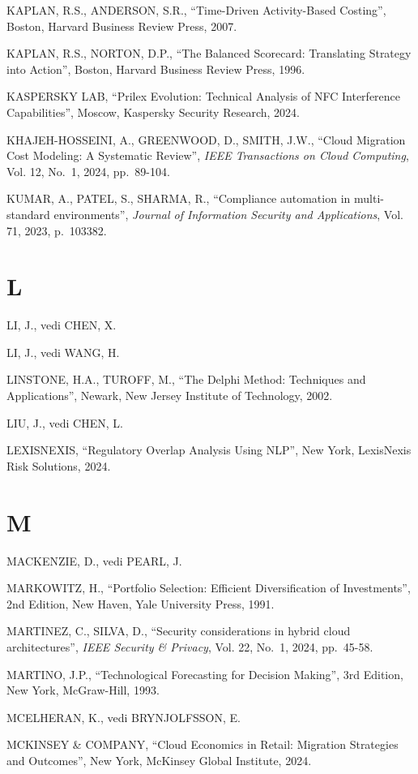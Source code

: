 \documentclass[12pt,a4paper,oneside]{book}
\numberwithin{figure}{chapter} %
\numberwithin{table}{chapter}  %
\begin{document}
KAPLAN, R.S., ANDERSON, S.R., ``Time-Driven Activity-Based Costing'',
Boston, Harvard Business Review Press, 2007.

KAPLAN, R.S., NORTON, D.P., ``The Balanced Scorecard: Translating
Strategy into Action'', Boston, Harvard Business Review Press, 1996.

KASPERSKY LAB, ``Prilex Evolution: Technical Analysis of NFC
Interference Capabilities'', Moscow, Kaspersky Security Research, 2024.

KHAJEH-HOSSEINI, A., GREENWOOD, D., SMITH, J.W., ``Cloud Migration Cost
Modeling: A Systematic Review'', \emph{IEEE Transactions on Cloud
Computing}, Vol. 12, No.~1, 2024, pp.~89-104.

KUMAR, A., PATEL, S., SHARMA, R., ``Compliance automation in
multi-standard environments'', \emph{Journal of Information Security and
Applications}, Vol. 71, 2023, p.~103382.

\section{L}\label{l-1}

LI, J., vedi CHEN, X.

LI, J., vedi WANG, H.

LINSTONE, H.A., TUROFF, M., ``The Delphi Method: Techniques and
Applications'', Newark, New Jersey Institute of Technology, 2002.

LIU, J., vedi CHEN, L.

LEXISNEXIS, ``Regulatory Overlap Analysis Using NLP'', New York,
LexisNexis Risk Solutions, 2024.

\section{M}\label{m-1}

MACKENZIE, D., vedi PEARL, J.

MARKOWITZ, H., ``Portfolio Selection: Efficient Diversification of
Investments'', 2nd Edition, New Haven, Yale University Press, 1991.

MARTINEZ, C., SILVA, D., ``Security considerations in hybrid cloud
architectures'', \emph{IEEE Security \& Privacy}, Vol. 22, No.~1, 2024,
pp.~45-58.

MARTINO, J.P., ``Technological Forecasting for Decision Making'', 3rd
Edition, New York, McGraw-Hill, 1993.

MCELHERAN, K., vedi BRYNJOLFSSON, E.

MCKINSEY \& COMPANY, ``Cloud Economics in Retail: Migration Strategies
and Outcomes'', New York, McKinsey Global Institute, 2024.
\end{document}
